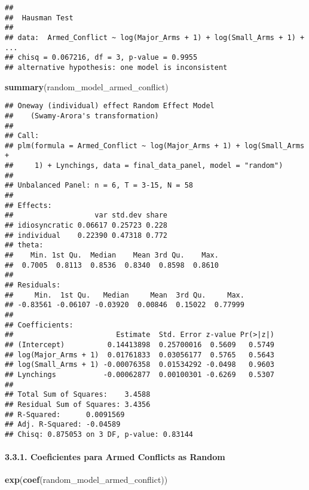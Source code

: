 \documentclass[
  11pt,
]{article}
\newenvironment{Shaded}{\begin{snugshade}}{\end{snugshade}}
\newcommand{\FunctionTok}[1]{\textcolor[rgb]{0.13,0.29,0.53}{\textbf{#1}}}
\newcommand{\NormalTok}[1]{#1}
\begin{document}
\begin{verbatim}
## 
##  Hausman Test
## 
## data:  Armed_Conflict ~ log(Major_Arms + 1) + log(Small_Arms + 1) +  ...
## chisq = 0.067216, df = 3, p-value = 0.9955
## alternative hypothesis: one model is inconsistent
\end{verbatim}

\begin{Shaded}
\begin{Highlighting}[]
\FunctionTok{summary}\NormalTok{(random\_model\_armed\_conflict) }
\end{Highlighting}
\end{Shaded}

\begin{verbatim}
## Oneway (individual) effect Random Effect Model 
##    (Swamy-Arora's transformation)
## 
## Call:
## plm(formula = Armed_Conflict ~ log(Major_Arms + 1) + log(Small_Arms + 
##     1) + Lynchings, data = final_data_panel, model = "random")
## 
## Unbalanced Panel: n = 6, T = 3-15, N = 58
## 
## Effects:
##                   var std.dev share
## idiosyncratic 0.06617 0.25723 0.228
## individual    0.22390 0.47318 0.772
## theta:
##    Min. 1st Qu.  Median    Mean 3rd Qu.    Max. 
##  0.7005  0.8113  0.8536  0.8340  0.8598  0.8610 
## 
## Residuals:
##     Min.  1st Qu.   Median     Mean  3rd Qu.     Max. 
## -0.83561 -0.06107 -0.03920  0.00846  0.15022  0.77999 
## 
## Coefficients:
##                        Estimate  Std. Error z-value Pr(>|z|)
## (Intercept)          0.14413898  0.25700016  0.5609   0.5749
## log(Major_Arms + 1)  0.01761833  0.03056177  0.5765   0.5643
## log(Small_Arms + 1) -0.00076358  0.01534292 -0.0498   0.9603
## Lynchings           -0.00062877  0.00100301 -0.6269   0.5307
## 
## Total Sum of Squares:    3.4588
## Residual Sum of Squares: 3.4356
## R-Squared:      0.0091569
## Adj. R-Squared: -0.04589
## Chisq: 0.875053 on 3 DF, p-value: 0.83144
\end{verbatim}

\paragraph{3.3.1. Coeficientes para Armed Conflicts as
Random}\label{coeficientes-para-armed-conflicts-as-random}

\begin{Shaded}
\begin{Highlighting}[]
\FunctionTok{exp}\NormalTok{(}\FunctionTok{coef}\NormalTok{(random\_model\_armed\_conflict))}
\end{Highlighting}
\end{Shaded}
\end{document}
